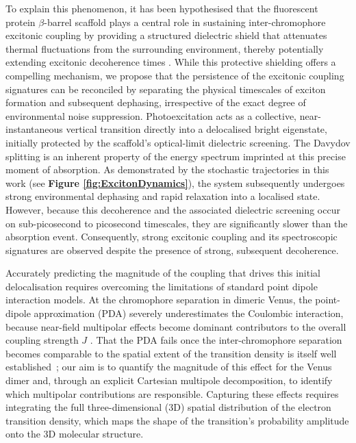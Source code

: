 \documentclass[journal=jpcbfk, manuscript=article, layout=twocolumn, doi=true]{achemso}
\begin{document}
To explain this phenomenon, it has been hypothesised that the fluorescent protein $\beta$-barrel scaffold plays a central role in sustaining inter-chromophore excitonic coupling by providing a structured dielectric shield that attenuates thermal fluctuations from the surrounding environment, thereby potentially extending excitonic decoherence times \cite{kim2019venusa206}. While this protective shielding offers a compelling mechanism, we propose that the {persistence of the} excitonic coupling {signatures} can be reconciled by separating the physical timescales of exciton formation and subsequent dephasing, irrespective of the exact degree of environmental noise suppression. Photoexcitation acts as a collective, near-instantaneous vertical transition directly into a delocalised bright eigenstate, initially protected by the scaffold's optical-limit dielectric screening. The Davydov splitting is an inherent property of the energy spectrum imprinted at this precise moment of absorption. As demonstrated by the stochastic trajectories in this work (see {\bf Figure \ref{fig:ExcitonDynamics}}), the system subsequently undergoes strong environmental dephasing and rapid relaxation into a localised state. However, because this decoherence and the associated dielectric screening occur on sub-picosecond to picosecond timescales, they are significantly slower than the absorption event. Consequently, strong excitonic coupling and its spectroscopic signatures are observed despite the presence of strong, subsequent decoherence.

Accurately predicting the magnitude of the coupling that drives this initial delocalisation requires overcoming the limitations of standard point dipole interaction models. At the chromophore separation in dimeric Venus, the point-dipole approximation (PDA) severely underestimates the Coulombic interaction, because near-field multipolar effects become dominant contributors to the overall coupling strength $J$ \cite{scholes2003, kitohnishioka2017forster}. {That the PDA fails once the inter-chromophore separation becomes comparable to the spatial extent of the transition density is itself well established~\cite{sobakinskaya2018theory, scholes2003}; our aim is to quantify the magnitude of this effect for the Venus dimer and, through an explicit Cartesian multipole decomposition, to identify which multipolar contributions are responsible.} Capturing these effects requires integrating the full three-dimensional (3D) spatial distribution of the electron transition density, which maps the shape of the transition's probability amplitude onto the 3D molecular structure.
\end{document}
